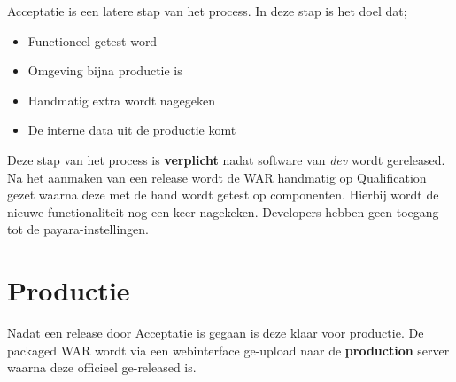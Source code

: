 \documentclass[12pt,a4paper]{scrreprt}
\begin{document}
	Acceptatie is een latere stap van het process. In deze stap is het doel dat;
	
	\begin{itemize}
		\item Functioneel getest word
		\item Omgeving bijna productie is
		\item Handmatig extra wordt nagegeken
		\item De interne data uit de productie komt
	\end{itemize}

	Deze stap van het process is \textbf{verplicht} nadat software van \textit{dev} wordt gereleased. Na het aanmaken van een release wordt de WAR handmatig op Qualification gezet waarna deze met de hand wordt getest op componenten. Hierbij wordt de nieuwe functionaliteit nog een keer nagekeken. Developers hebben geen toegang  tot de payara-instellingen.
	
	\section{Productie}
	
	Nadat een release door Acceptatie is gegaan is deze  klaar voor productie. De packaged WAR wordt via een webinterface ge-upload naar de \textbf{production} server waarna deze officieel ge-released is.
\end{document}
